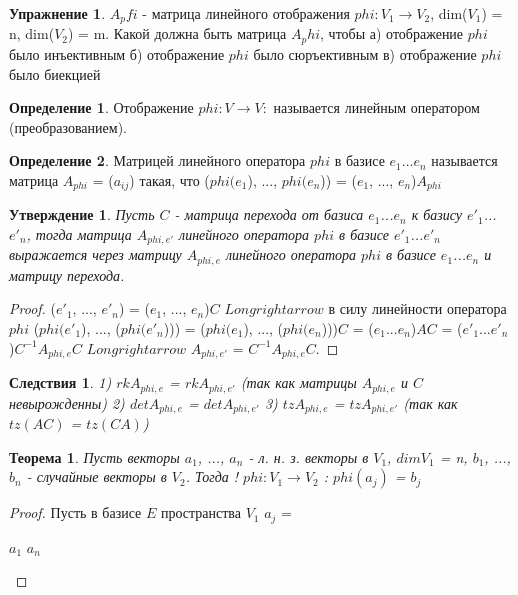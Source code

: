 \documentclass[a4paper, 12pt]{article}
\theoremstyle{definition}
\newtheorem*{definition}{Определение}
\newtheorem*{exercise}{Упражнение}
\theoremstyle{plain}
\newtheorem*{theorem}{Теорема}
\newtheorem*{consequenses}{Следствия}
\newtheorem*{subtheorem}{Утверждение}
\theoremstyle{remark}
\begin{document}
  \newpage
  \begin {exercise} $A_pfi$ - матрица линейного отображения $phi: V_1 \to V_2$, dim($V_1$) = n, dim($V_2$) = m. Какой должна быть матрица $A_phi$, чтобы 
    а) отображение $phi$ было инъективным
    б) отображение $phi$ было сюръективным
    в) отображение $phi$ было биекцией
  \end {exercise}
  \begin {definition} 
    Отображение $phi: V \to V:$ называется линейным оператором (преобразованием).
  \end {definition}
  \begin {definition}
    Матрицей линейного оператора $phi$ в базисе {$e_1$...$e_n$} называется матрица $A_{phi}$ = ($a_{ij}$) такая, что ($phi(e_1$), ..., $phi(e_n$)) = ($e_1$, ..., $e_n$)$A_{phi}$
  \end {definition}
  \begin {subtheorem}
    Пусть $C$ - матрица перехода от базиса {$e_1$...$e_n$} к базису {$e'_1$...$e'_n$}, тогда матрица $A_{phi, e'}$ линейного оператора $phi$ в базисе {$e'_1$...$e'_n$} выражается через матрицу $A_{phi, e}$ линейного оператора $phi$ в базисе {$e_1$...$e_n$} и матрицу перехода.
  \end {subtheorem}
  \begin {proof}
    ($e'_1$, ..., $e'_n$) = ($e_1$, ..., $e_n$)$C$
    $Longrightarrow$ в силу линейности оператора $phi$ ($phi(e'_1$), ..., ($phi(e'_n$))) = ($phi(e_1$), ..., ($phi(e_n$)))$C$ = ($e_1$...$e_n$)$AC$ = ($e'_1$...$e'_n$)$C^{-1}A_{phi, e}C$
    $Longrightarrow$ $A_{phi, e'}$ = $C^{-1}A_{phi, e}C$.
  \end {proof}
  \begin {consequenses} 
    1) $rkA_{phi, e}$ = $rkA_{phi, e'}$ (так как матрицы $A_{phi, e}$ и $C$ невырожденны)
    2) $detA_{phi, e}$ = $detA_{phi, e'}$
    3) $tzA_{phi, e}$ = $tzA_{phi, e'}$ (так как $tz(AC)$ = $tz(CA)$)
  \end {consequenses}
  \begin {theorem}
    Пусть векторы $a_1$, ..., $a_n$ - л. н. з. векторы в $V_1$, $dimV_1$ = n, $b_1$, ..., $b_n$ - случайные векторы в $V_2$. Тогда \exists!  $phi: V_1 \to V_2$ : $phi(a_j)$ = $b_j$
  \end {theorem}
  \begin {proof}
    Пусть в базисе $E$ пространства $V_1$ $a_j$ = \begin {pmatrix}
    $a_1$
    $a_n$
    \end {pmatrix}
  \end {proof}
\end{document}
